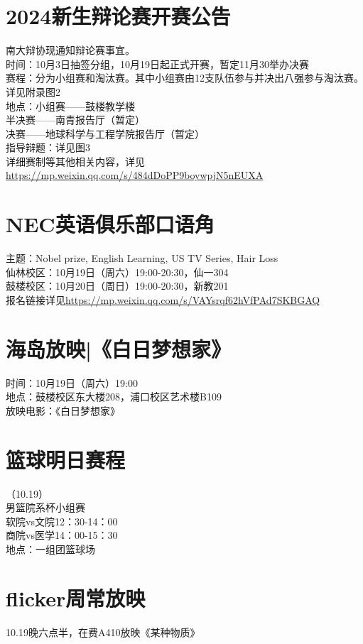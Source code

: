 \documentclass[letterpaper, 12pt]{article}
\begin{document}
\begin{multicols}{2}
\section{2024新生辩论赛开赛公告}
南大辩协现通知辩论赛事宜。\\
时间：10月3日抽签分组，10月19日起正式开赛，暂定11月30举办决赛\\
赛程：分为小组赛和淘汰赛。其中小组赛由12支队伍参与并决出八强参与淘汰赛。详见附录图2\\
地点：小组赛——鼓楼教学楼\\  半决赛——南青报告厅（暂定）\\  决赛——地球科学与工程学院报告厅（暂定）\\
指导辩题：详见图3\\
详细赛制等其他相关内容，详见\url{https://mp.weixin.qq.com/s/484dDoPP9boywpjN5nEUXA}\\
\section{NEC英语俱乐部口语角}
主题：Nobel prize, English Learning, US TV Series, Hair Loss\\
仙林校区：10月19日（周六）19:00-20:30，仙一304\\
鼓楼校区：10月20日（周日）19:00-20:30，新教201\\
报名链接详见\url{https://mp.weixin.qq.com/s/VAYsrqf62hVfPAd7SKBGAQ}

\section{海岛放映|《白日梦想家》}
时间：10月19日（周六）19:00\\
地点：鼓楼校区东大楼208，浦口校区艺术楼B109\\
放映电影：《白日梦想家》\\

\section{篮球明日赛程}
（10.19）\\
男篮院系杯小组赛\\
软院vs文院12：30-14：00\\
商院vs医学14：00-15：30\\
地点：一组团篮球场\\

\section{flicker周常放映}
10.19晚六点半，在费A410放映《某种物质》

\end{multicols} 
\end{document}
